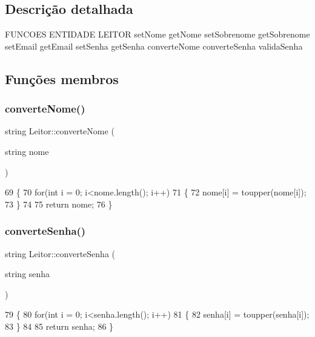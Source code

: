 \subsection{Descrição detalhada}
F\+U\+N\+C\+O\+ES E\+N\+T\+I\+D\+A\+DE L\+E\+I\+T\+OR set\+Nome get\+Nome set\+Sobrenome get\+Sobrenome set\+Email get\+Email set\+Senha get\+Senha converte\+Nome converte\+Senha valida\+Senha 

\subsection{Funções membros}
\mbox{\label{class_leitor_a013a50e7e5d471efe31ce4f612b7399d}} 
\subsubsection{\texorpdfstring{converte\+Nome()}{converteNome()}}
{\footnotesize\ttfamily string Leitor\+::converte\+Nome (\begin{DoxyParamCaption}\item[{string}]{nome }\end{DoxyParamCaption})\hspace{0.3cm}{\ttfamily [inline]}}


\begin{DoxyCode}
69 \{
70  \textcolor{keywordflow}{for}(\textcolor{keywordtype}{int} i = 0; i<nome.length(); i++)
71  \{
72    nome[i] = toupper(nome[i]);
73  \}
74 
75  \textcolor{keywordflow}{return} nome;
76 \}
\end{DoxyCode}
\mbox{\label{class_leitor_ad18d27138f12d31c4d7d3b011b7d1579}} 
\subsubsection{\texorpdfstring{converte\+Senha()}{converteSenha()}}
{\footnotesize\ttfamily string Leitor\+::converte\+Senha (\begin{DoxyParamCaption}\item[{string}]{senha }\end{DoxyParamCaption})\hspace{0.3cm}{\ttfamily [inline]}}


\begin{DoxyCode}
79 \{
80  \textcolor{keywordflow}{for}(\textcolor{keywordtype}{int} i = 0; i<senha.length(); i++)
81  \{
82    senha[i] = toupper(senha[i]);
83  \}
84 
85  \textcolor{keywordflow}{return} senha;
86 \}
\end{DoxyCode}
\mbox{\label{class_leitor_ae6cd620931ae336b9d9afa4f83944fc1}} 

